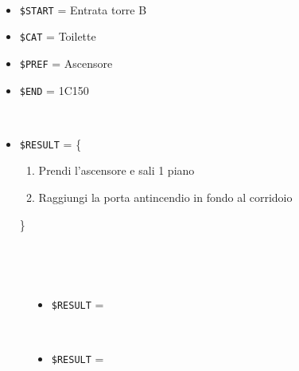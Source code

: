 \documentclass[../../SperimentazioniPratiche.tex]{subfiles}
\begin{document}
			\begin{tcolorbox}[fonttitle=\bfseries, 
								adjusted title={\Large Prova 2A.1}, 
								breakable, 
								sharp corners=south,
								colback=white, 
								colframe=white!60!black]
								
				\begin{description}[leftmargin=0.7cm,labelwidth=!]
				
					\item[Input] \ \par 
        				\begin{itemize}
        					\item \verb|$START| = Entrata torre B
							\item \verb|$CAT| = Toilette
							\item \verb|$PREF| = Ascensore
        					\item \verb|$END| = 1C150
        				\end{itemize}
        				
        			\tcbline 
        				
        			\item[Output atteso] \ \par
        				\begin{itemize}
        					\item \verb|$RESULT| = \{
        						\begin{enumerate}
        							\item Prendi l'ascensore e sali 1 piano
									\item Raggiungi la porta antincendio in fondo al corridoio
        						\end{enumerate}
        					\}
        				\end{itemize}

					\tcbline        				
        				
        			\item[Output riscontrato] \ \par
        				\begin{description}
        				
        					\item[\dispositivoA] \ \par
        					\begin{itemize}
        						\item \verb|$RESULT| = \ns
        					\end{itemize}      					
        					
        					\item[\dispositivoB] \ \par
        					\begin{itemize}
        						\item \verb|$RESULT| = \ns
        					\end{itemize}
        					

\end{description}
\end{description}
\end{tcolorbox}
\end{document}
